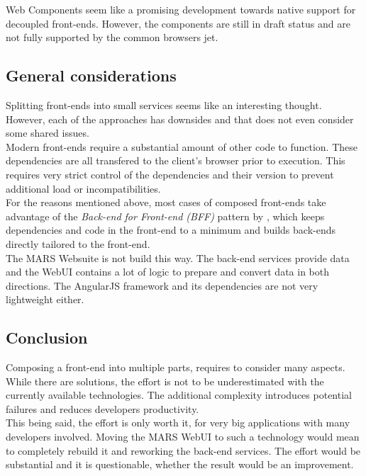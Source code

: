 Web Components seem like a promising development towards native support for decoupled front-ends. However, the components are still in draft status and are not fully supported by the common browsers jet.


\subsection{General considerations}
Splitting front-ends into small services seems like an interesting thought. However, each of the approaches has downsides and that does not even consider some shared issues.\\
Modern front-ends require a substantial amount of other code to function. These dependencies are all transfered to the client's browser prior to execution. This requires very strict control of the dependencies and their version to prevent additional load or incompatibilities.\\
For the reasons mentioned above, most cases of composed front-ends take advantage of the \textit{Back-end for Front-end (BFF)} pattern by \cite{newman2015bff}, which keeps dependencies and code in the front-end to a minimum and builds back-ends directly tailored to the front-end.\\
The MARS Websuite is not build this way. The back-end services provide data and the WebUI contains a lot of logic to prepare and convert data in both directions. The AngularJS framework and its dependencies are not very lightweight either.\\


\subsection{Conclusion}
Composing a front-end into multiple parts, requires to consider many aspects. While there are solutions, the effort is not to be underestimated with the currently available technologies. The additional complexity introduces potential failures and reduces developers productivity.\\
This being said, the effort is only worth it, for very big applications with many developers involved. Moving the MARS WebUI to such a technology would mean to completely rebuild it and reworking the back-end services. The effort would be substantial and it is questionable, whether the result would be an improvement.



